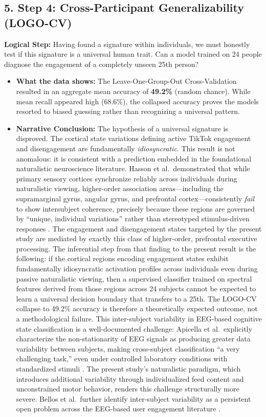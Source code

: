 \documentclass[12pt,a4paper]{report}
\begin{document}
\subsection{5. Step 4: Cross-Participant Generalizability (LOGO-CV)}
\label{sec:logo_cv}
\textbf{Logical Step:} Having found a signature within individuals, we must honestly test if this signature is a universal human trait. Can a model trained on 24 people diagnose the engagement of a completely unseen 25th person?
\begin{itemize}
    \item \textbf{What the data shows:} The Leave-One-Group-Out Cross-Validation resulted in an aggregate mean accuracy of \textbf{49.2\%} (random chance). While mean recall appeared high (68.6\%), the collapsed accuracy proves the models resorted to biased guessing rather than recognizing a universal pattern.
    \item \textbf{Narrative Conclusion:} The hypothesis of a universal signature is disproved. The cortical state variations defining active TikTok engagement and disengagement are fundamentally \textit{idiosyncratic}. This result is not anomalous: it is consistent with a prediction embedded in the foundational naturalistic neuroscience literature. Hasson et al.\ demonstrated that while primary sensory cortices synchronize reliably across individuals during naturalistic viewing, higher-order association areas---including the supramarginal gyrus, angular gyrus, and prefrontal cortex---consistently \textit{fail} to show intersubject coherence, precisely because these regions are governed by ``unique, individual variations'' rather than stereotyped stimulus-driven responses \cite{hasson_intersubject_2004}. The engagement and disengagement states targeted by the present study are mediated by exactly this class of higher-order, prefrontal executive processing. The inferential step from that finding to the present result is the following: if the cortical regions encoding engagement states exhibit fundamentally idiosyncratic activation profiles across individuals even during passive naturalistic viewing, then a supervised classifier trained on spectral features derived from those regions across 24 subjects cannot be expected to learn a universal decision boundary that transfers to a 25th. The LOGO-CV collapse to 49.2\% accuracy is therefore a theoretically expected outcome, not a methodological failure. This inter-subject variability in EEG-based cognitive state classification is a well-documented challenge: Apicella et al.\ explicitly characterize the non-stationarity of EEG signals as producing greater data variability between subjects, making cross-subject classification ``a very challenging task,'' even under controlled laboratory conditions with standardized stimuli \cite{apicella_eeg-based_2022}. The present study's naturalistic paradigm, which introduces additional variability through individualized feed content and unconstrained motor behavior, renders this challenge structurally more severe. Bellos et al.\ further identify inter-subject variability as a persistent open problem across the EEG-based user engagement literature \cite{bellos_methods_2025}.
\end{itemize}
\end{document}
